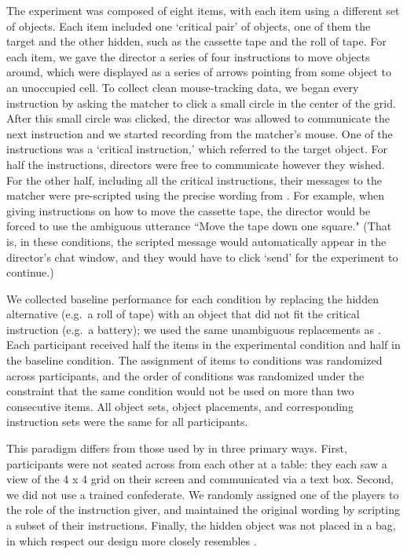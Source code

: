 \documentclass[manuscript]{stjour}
\begin{document}
The experiment was composed of eight items, with each item using a different set of objects. Each item included one `critical pair' of objects, one of them the target and the other hidden, such as the cassette tape and the roll of tape. For each item, we gave the director a series of four instructions to move objects around, which were displayed as a series of arrows pointing from some object to an unoccupied cell. 
To collect clean mouse-tracking data, we began every instruction by asking the matcher to click a small circle in the center of the grid. After this small circle was clicked, the director was allowed to communicate the next instruction and we started recording from the matcher's mouse. 
One of the instructions was a `critical instruction,' which referred to the target object.
For half the instructions, directors were free to communicate however they wished. For the other half, including all the critical instructions, their messages to the matcher were pre-scripted using the precise wording from \cite{KeysarLinBarr03_LimitsOnTheoryOfMindUse}. For example, when giving instructions on how to move the cassette tape, the director would be forced to use the ambiguous utterance ``Move the tape down one square." (That is, in these conditions, the scripted message would automatically appear in the director's chat window, and they would have to click `send' for the experiment to continue.)

We collected baseline performance for each condition by replacing the hidden alternative (e.g.~a roll of tape) with an object that did not fit the critical instruction (e.g.~a battery); we used the same unambiguous replacements as \cite{KeysarLinBarr03_LimitsOnTheoryOfMindUse}. Each participant received half the items in the experimental condition and half in the baseline condition. The assignment of items to conditions was randomized across participants, and the order of conditions was randomized under the constraint that the same condition would not be used on more than two consecutive items. All object sets, object placements, and corresponding instruction sets were the same for all participants.

This paradigm differs from those used by \cite{KeysarLinBarr03_LimitsOnTheoryOfMindUse} in three primary ways. First, participants were not seated across from each other at a table: they each saw a view of the 4 x 4 grid on their screen and communicated via a text box. Second, we did not use a trained confederate. We randomly assigned one of the players to the role of the instruction giver, and maintained the original wording by scripting a subset of their instructions. Finally, the hidden object was not placed in a bag, in which respect our design more closely resembles \cite{KeysarBarr___Brauner00_TakingPerspective}.
\end{document}
